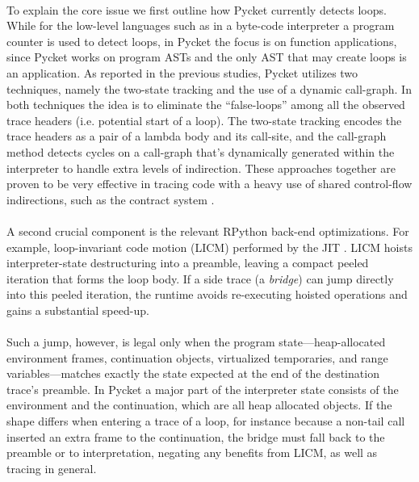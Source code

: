 	\paragraph{}%
		To explain the core issue we first outline how Pycket currently detects loops. While for the low-level languages such as in a byte-code interpreter a program counter is used to detect loops, in Pycket the focus is on function applications, since Pycket works on program ASTs and the only AST that may create loops is an application. As reported in the previous studies, Pycket utilizes two techniques, namely the two-state tracking and the use of a dynamic call-graph. In both techniques the idea is to eliminate the “false-loops” among all the observed trace headers (i.e. potential start of a loop). The two-state tracking encodes the trace headers as a pair of a lambda body and its call-site, and the call-graph method detects cycles on a call-graph that's dynamically generated within the interpreter to handle extra levels of indirection. These approaches together are proven to be very effective in tracing code with a heavy use of shared control-flow indirections, such as the contract system \cite{pycketmain,pycketmain2}.

	\paragraph{}%
		A second crucial component is the relevant RPython back-end optimizations. For example, loop-invariant code motion (LICM) performed by the JIT \cite{loop-aware:12}. LICM hoists interpreter-state destructuring into a preamble, leaving a compact peeled iteration that forms the loop body. If a side trace (a \emph{bridge}) can jump directly into this peeled iteration, the runtime avoids re-executing hoisted operations and gains a substantial speed-up.

	\paragraph{}%
		Such a jump, however, is legal only when the program state—heap-allocated environment frames, continuation objects, virtualized temporaries, and range variables—matches exactly the state expected at the end of the destination trace's preamble. In Pycket a major part of the interpreter state consists of the environment and the continuation, which are all heap allocated objects. If the shape differs when entering a trace of a loop, for instance because a non-tail call inserted an extra frame to the continuation, the bridge must fall back to the preamble or to interpretation, negating any benefits from LICM, as well as tracing in general.

